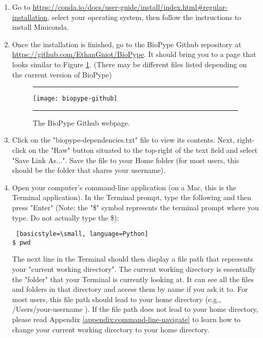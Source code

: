 \begin{enumerate}
\item Go to \url{https://conda.io/docs/user-guide/install/index.html#regular-installation}, select your operating system, then follow the instructions to install Miniconda.


\item Once the installation is finished, go to the BioPype Github repository at \url{https://github.com/EthanGniot/BioPype}. It should bring you to a page that looks similar to Figure \ref{fig:biopype-github}. (There may be different files listed depending on the current version of BioPype)
\begin{figure}[hbtp]
    \begin{maxipage}
    \hrule
    \centering
    \texttt{[image: biopype-github]}
    \caption{The BioPype Github webpage.}
    \label{fig:biopype-github}
    \hrule
    \end{maxipage}
\end{figure}


\item Click on the "biopype-dependencies.txt" file to view its contents. Next, right-click on the "Raw" button situated to the top-right of the text field and select "Save Link As...". Save the file to your Home folder (for most users, this should be the folder that shares your username). 


\item Open your computer's command-line application (on a Mac, this is the Terminal application). In the Terminal prompt, type the following and then press "Enter" (Note: the "\$" symbol represents the terminal prompt where you type. Do not actually type the \$):
    \begin{lstlisting} [basicstyle=\small, language=Python]
$ pwd
    \end{lstlisting}

The next line in the Terminal should then display a file path that represents your "current working directory". The current working directory is essentially the "folder" that your Terminal is currently looking at. It can see all the files and folders in that directory and access them by name if you ask it to.  For most users, this file path should lead to your home directory (e.g., /Users/your-username ). If the file path does not lead to your home directory, please read Appendix \ref{appendix:command-line-navigate} to learn how to change your current working directory to your home directory. 


\end{enumerate}

